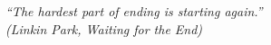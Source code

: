 \begin{epigrafe}
    \vspace*{\fill}
	\begin{flushright}

   \textit{``The hardest part of ending is starting again.'' \\  
   (Linkin Park, Waiting for the End)
   }
	\end{flushright}
\end{epigrafe}


